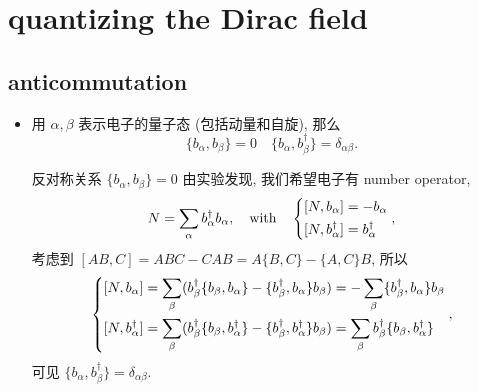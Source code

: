 \chapter{quantizing the Dirac field}
\section{anticommutation} \label{8.1}
\begin{itemize}
	\item 用 $\alpha, \beta$ 表示电子的量子态 (包括动量和自旋), 那么
	\begin{equation}
		\{b_\alpha, b_\beta\} = 0 \quad \{b_\alpha, b^\dag_\beta\} = \delta_{\alpha \beta}.
	\end{equation}
	
	\begin{tcolorbox}[title=comment:]
		反对称关系 $\{b_\alpha, b_\beta\} = 0$ 由实验发现, 我们希望电子有 number operator,
		\begin{equation}
			N = \sum_\alpha b^\dag_\alpha b_\alpha, \quad \text{with} \quad \begin{dcases}
				[N, b_\alpha] = - b_\alpha \\
				[N, b^\dag_\alpha] = b^\dag_\alpha
			\end{dcases},
		\end{equation}
		考虑到 $[A B, C] = A B C - C A B = A \{B, C\} - \{A, C\} B$, 所以
		\begin{equation}
			\begin{dcases}
				[N, b_\alpha] = \sum_\beta (b^\dag_\beta \{b_\beta, b_\alpha\} - \{b^\dag_\beta, b_\alpha\} b_\beta) = - \sum_\beta \{b^\dag_\beta, b_\alpha\} b_\beta \\
				[N, b^\dag_\alpha] = \sum_\beta (b^\dag_\beta \{b_\beta, b^\dag_\alpha\} - \{b^\dag_\beta, b^\dag_\alpha\} b_\beta) = \sum_\beta b^\dag_\beta \{b_\beta, b^\dag_\alpha\}
			\end{dcases},
		\end{equation}
		可见 $\{b_\alpha, b^\dag_\beta\} = \delta_{\alpha \beta}$.
	\end{tcolorbox}
\end{itemize}

